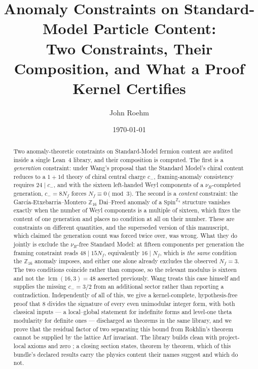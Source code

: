 \documentclass[aps,prd,reprint,nofootinbib,superscriptaddress]{revtex4-2}
\makeatletter
\DeclareRobustCommand{\texttt}[1]{%
  \skeft@origtexttt{\let\skeftunder\_\def\_{\skeftunder\allowbreak}#1}}
\makeatother
\begin{document}
\title{Anomaly Constraints on Standard-Model Particle Content:\\
Two Constraints, Their Composition, and What a Proof Kernel Certifies}

\author{John Roehm}

\date{\today}

\begin{abstract}
Two anomaly-theoretic constraints on Standard-Model fermion content are
audited inside a single Lean~4 library, and their composition is
computed. The first is a \emph{generation} constraint: under Wang's
proposal that the Standard Model's chiral content reduces to a $1{+}1$d
theory of chiral central charge $c_{-}$, framing-anomaly consistency
requires $24 \mid c_{-}$, and with the sixteen left-handed Weyl
components of a $\nu_R$-completed generation, $c_{-} = 8 N_f$ forces
$N_f \equiv 0 \pmod 3$. The second is a \emph{content} constraint: the
Garc\'ia-Etxebarria--Montero $\mathbb{Z}_{16}$ Dai--Freed anomaly of a
$\mathrm{Spin}^{\mathbb{Z}_4}$ structure vanishes exactly when the number
of Weyl components is a multiple of sixteen, which fixes the content of
one generation and places no condition at all on their number. These are
constraints on different quantities, and the superseded version of this
manuscript, which claimed the generation count was forced twice over, was
wrong. What they do jointly is exclude the $\nu_R$-free Standard Model:
at fifteen components per generation the framing constraint reads
$48 \mid 15 N_f$, equivalently $16 \mid N_f$, which is \emph{the same}
condition the $\mathbb{Z}_{16}$ anomaly imposes, and either one alone
already excludes the observed $N_f = 3$. The two conditions coincide
rather than compose, so the relevant modulus is sixteen and not the
$\operatorname{lcm}(16,3) = 48$ asserted previously. Wang treats this
case himself and supplies the missing $c_{-} = 3/2$ from an additional
sector rather than reporting a contradiction. Independently of all of
this, we give a kernel-complete, hypothesis-free proof that $8$ divides
the signature of every even unimodular integer form, with both classical
inputs --- a local--global statement for indefinite forms and level-one
theta modularity for definite ones --- discharged as theorems in the same
library, and we prove that the residual factor of two separating this
bound from Rokhlin's theorem cannot be supplied by the lattice Arf
invariant. The library builds clean with \axiomcount{} project-local
axioms and zero \texttt{sorry}; a closing section states, theorem by
theorem, which of this bundle's declared results carry the physics content
their names suggest and which do not.
\end{abstract}
\end{document}
